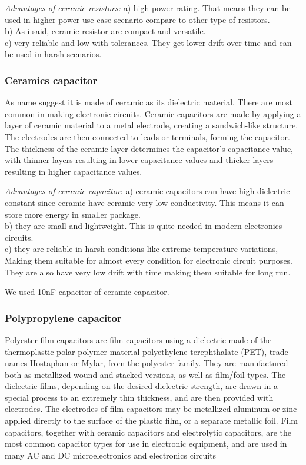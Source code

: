 \documentclass[14pt,a4paper]{extarticle}
\begin{document}
\emph{Advantages of ceramic resistors:} a) high power rating. That means they can be used in higher power use case scenario compare to other type of resistors. \\
b) As i said, ceramic resistor are compact and versatile. \\
c) very reliable and low with tolerances. They get lower drift over time and can be used in harsh scenarios.\\
\subsubsection{Ceramics capacitor}
\label{sec:orgd32a6a6}

As name suggest it is made of ceramic as its dielectric material. There are most common in making electronic circuits. Ceramic capacitors are made by applying a layer of ceramic material to a metal electrode, creating a sandwich-like structure. The electrodes are then connected to leads or terminals, forming the capacitor. The thickness of the ceramic layer determines the capacitor's capacitance value, with thinner layers resulting in lower capacitance values and thicker layers resulting in higher capacitance values.

\emph{Advantages of ceramic capacitor}: a) ceramic capacitors can have high dielectric constant since ceramic have ceramic very low conductivity. This means it can store more energy in smaller package.\\
b) they are small and lightweight. This is quite needed in modern electronics circuits.\\
c) they are reliable in harsh conditions like extreme temperature variations, Making them suitable for almost every condition for electronic circuit purposes. They are also have very low drift with time making them suitable for long run.

We used 10nF capacitor of ceramic capacitor.
\subsubsection{Polypropylene capacitor}
\label{sec:orgf376a23}
Polyester film capacitors are film capacitors using a dielectric made of the thermoplastic polar polymer material polyethylene terephthalate (PET), trade names Hostaphan or Mylar, from the polyester family. They are manufactured both as metallized wound and stacked versions, as well as film/foil types. The dielectric films, depending on the desired dielectric strength, are drawn in a special process to an extremely thin thickness, and are then provided with electrodes. The electrodes of film capacitors may be metallized aluminum or zinc applied directly to the surface of the plastic film, or a separate metallic foil. Film capacitors, together with ceramic capacitors and electrolytic capacitors, are the most common capacitor types for use in electronic equipment, and are used in many AC and DC microelectronics and electronics circuits
\end{document}
